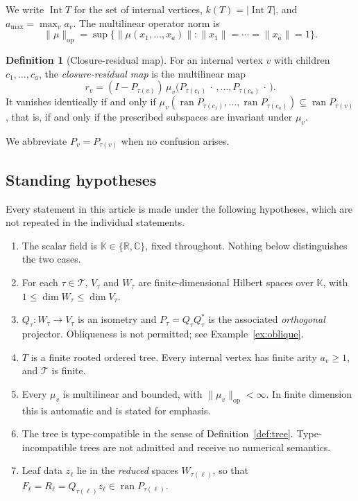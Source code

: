 \documentclass[11pt]{amsart}
\theoremstyle{definition}
\newtheorem{definition}[theorem]{Definition}
\theoremstyle{remark}
\newcommand{\ran}{\operatorname{ran}}
\newcommand{\Int}{\operatorname{Int}}
\newcommand{\op}{\mathrm{op}}
\newcommand{\Types}{\mathcal T}
\newcommand{\norm}[1]{\lVert#1\rVert}
\begin{document}
We write $\Int T$ for the set of internal vertices, $k(T)=\lvert\Int T\rvert$, and
$a_{\max}=\max_{v}a_v$. The multilinear operator norm is
\[
 \norm{\mu}_\op
 =\sup\{\norm{\mu(x_1,\ldots,x_a)}:\norm{x_1}=\cdots=\norm{x_a}=1\}.
\]

\begin{definition}[Closure-residual map]
\label{def:closure}
For an internal vertex $v$ with children $c_1,\ldots,c_{a}$, the \emph{closure-residual
map} is the multilinear map
\[
 r_v
 =(I-P_{\tau(v)})\,\mu_v\bigl(P_{\tau(c_1)}\,\cdot\,,\ldots,P_{\tau(c_a)}\,\cdot\,\bigr).
\]
It vanishes identically if and only if
$\mu_v(\ran P_{\tau(c_1)},\ldots,\ran P_{\tau(c_a)})\subseteq\ran P_{\tau(v)}$, that is,
if and only if the prescribed subspaces are invariant under $\mu_v$.
\end{definition}

We abbreviate $P_v=P_{\tau(v)}$ when no confusion arises.

\begin{table}[t]
\centering\small
\caption{Notation.}
\label{tab:notation}

\end{table}

\subsection{Standing hypotheses}
\label{sec:standing}

Every statement in this article is made under the following hypotheses, which are not
repeated in the individual statements.

\begin{enumerate}[leftmargin=*,label=(H\arabic*)]
\item\label{h:field} The scalar field is $\mathbb K\in\{\mathbb R,\mathbb C\}$, fixed
throughout. Nothing below distinguishes the two cases.
\item\label{h:spaces} For each $\tau\in\Types$, $V_\tau$ and $W_\tau$ are
finite-dimensional Hilbert spaces over $\mathbb K$, with $1\le\dim W_\tau\le\dim V_\tau$.
\item\label{h:proj} $Q_\tau:W_\tau\to V_\tau$ is an isometry and $P_\tau=Q_\tau Q_\tau^{*}$
is the associated \emph{orthogonal} projector. Obliqueness is not permitted; see
Example~\ref{ex:oblique}.
\item\label{h:tree} $T$ is a finite rooted ordered tree. Every internal vertex has finite
arity $a_v\ge1$, and $\Types$ is finite.
\item\label{h:bounded} Every $\mu_v$ is multilinear and bounded, with
$\norm{\mu_v}_\op<\infty$. In finite dimension this is automatic and is stated for
emphasis.
\item\label{h:types} The tree is type-compatible in the sense of
Definition~\ref{def:tree}. Type-incompatible trees are not admitted and receive no
numerical semantics.
\item\label{h:leafdata} Leaf data $z_\ell$ lie in the \emph{reduced} spaces
$W_{\tau(\ell)}$, so that $F_\ell=R_\ell=Q_{\tau(\ell)}z_\ell\in\ran P_{\tau(\ell)}$.
\end{enumerate}
\end{document}
